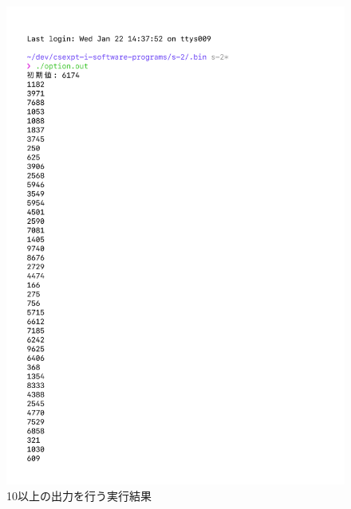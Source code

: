 % 
\begin{figure}[H]
    \centering
    \includegraphics[width=0.8\hsize, pagebox=mediabox, page=1]{option_result_img.pdf}
    \caption{10以上の出力を行う実行結果}
    \label{10以上の出力を行う実行結果}
\end{figure}
